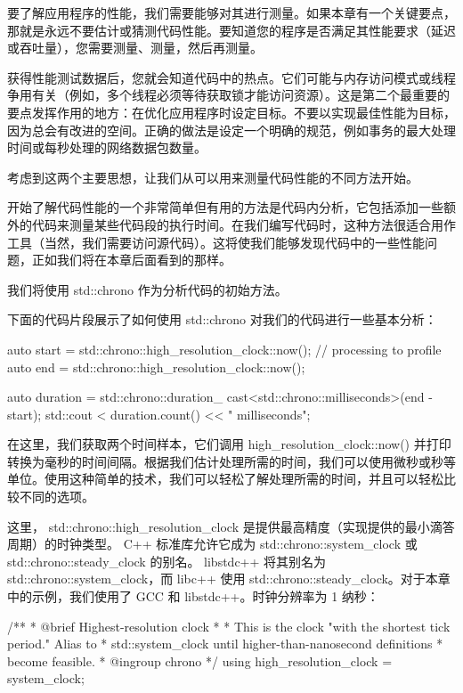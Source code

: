 

要了解应用程序的性能，我们需要能够对其进行测量。如果本章有一个关键要点，那就是永远不要估计或猜测代码性能。要知道您的程序是否满足其性能要求（延迟或吞吐量），您需要测量、测量，然后再测量。

获得性能测试数据后，您就会知道代码中的热点。它们可能与内存访问模式或线程争用有关（例如，多个线程必须等待获取锁才能访问资源）。这是第二个最重要的要点发挥作用的地方：在优化应用程序时设定目标。不要以实现最佳性能为目标，因为总会有改进的空间。正确的做法是设定一个明确的规范，例如事务的最大处理时间或每秒处理的网络数据包数量。

考虑到这两个主要思想，让我们从可以用来测量代码性能的不同方法开始。


开始了解代码性能的一个非常简单但有用的方法是代码内分析，它包括添加一些额外的代码来测量某些代码段的执行时间。在我们编写代码时，这种方法很适合用作工具（当然，我们需要访问源代码）。这将使我们能够发现代码中的一些性能问题，正如我们将在本章后面看到的那样。

我们将使用 std::chrono 作为分析代码的初始方法。

下面的代码片段展示了如何使用 std::chrono 对我们的代码进行一些基本分析：

\begin{cpp}
auto start = std::chrono::high_resolution_clock::now();
// processing to profile
auto end = std::chrono::high_resolution_clock::now();

auto duration = std::chrono::duration_
cast<std::chrono::milliseconds>(end - start);
std::cout < duration.count() << " milliseconds\n";
\end{cpp}

在这里，我们获取两个时间样本，它们调用 high\_resolution\_clock::now() 并打印转换为毫秒的时间间隔。根据我们估计处理所需的时间，我们可以使用微秒或秒等单位。使用这种简单的技术，我们可以轻松了解处理所需的时间，并且可以轻松比较不同的选项。

这里， std::chrono::high\_resolution\_clock 是提供最高精度（实现提供的最小滴答周期）的时钟类型。 C++ 标准库允许它成为 std::chrono::system\_clock 或 std::chrono::steady\_clock 的别名。 libstdc++ 将其别名为 std::chrono::system\_clock，而 libc++ 使用 std::chrono::steady\_clock。对于本章中的示例，我们使用了 GCC 和 libstdc++。时钟分辨率为 1 纳秒：

\begin{cpp}
/**
 * @brief Highest-resolution clock
 *
 * This is the clock "with the shortest tick period." Alias to
 * std::system_clock until higher-than-nanosecond definitions
 * become feasible.
 * @ingroup chrono
*/
using high_resolution_clock = system_clock;
\end{cpp}

